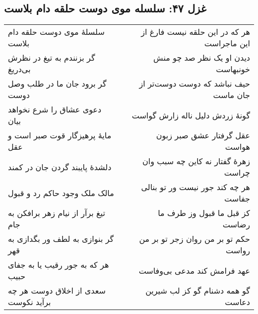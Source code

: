 \begin{center}
\section*{غزل ۴۷: سلسله موی دوست حلقه دام بلاست}
\label{sec:047}
\begin{longtable}{l p{0.5cm} r}
سلسلهٔ موی دوست حلقه دام بلاست
&&
هر که در این حلقه نیست فارغ از این ماجراست
\\
گر بزنندم به تیغ در نظرش بی‌دریغ
&&
دیدن او یک نظر صد چو منش خونبهاست
\\
گر برود جان ما در طلب وصل دوست
&&
حیف نباشد که دوست دوست‌تر از جان ماست
\\
دعوی عشاق را شرع نخواهد بیان
&&
گونهٔ زردش دلیل ناله زارش گواست
\\
مایهٔ پرهیزگار قوت صبر است و عقل
&&
عقل گرفتار عشق صبر زبون هواست
\\
دلشدهٔ پایبند گردن جان در کمند
&&
زهرهٔ گفتار نه کاین چه سبب وان چراست
\\
مالک ملک وجود حاکم رد و قبول
&&
هر چه کند جور نیست ور تو بنالی جفاست
\\
تیغ برآر از نیام زهر برافکن به جام
&&
کز قبل ما قبول وز طرف ما رضاست
\\
گر بنوازی به لطف ور بگدازی به قهر
&&
حکم تو بر من روان زجر تو بر من رواست
\\
هر که به جور رقیب یا به جفای حبیب
&&
عهد فرامش کند مدعی بی‌وفاست
\\
سعدی از اخلاق دوست هر چه برآید نکوست
&&
گو همه دشنام گو کز لب شیرین دعاست
\\
\end{longtable}
\end{center}
